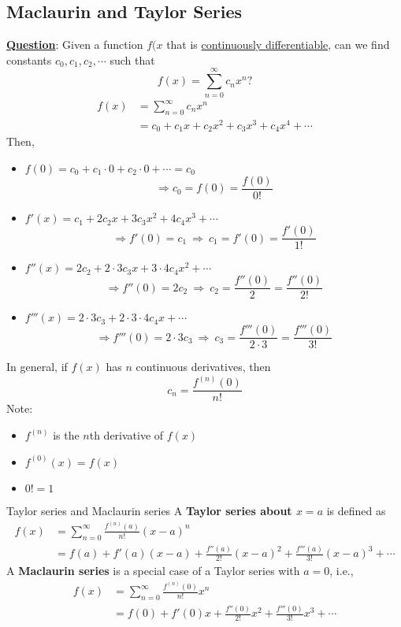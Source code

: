\documentclass[12pt,a4paper]{article}
\begin{document}
\subsection{Maclaurin and Taylor Series}
\textbf{\underline{Question}}: Given a function $f(x$ that is \underline{continuously differentiable}, can we find constants $c_0, c_1, c_2,\cdots$ such that $$f(x)=\sum^\infty_{n=0}c_nx^n?$$
$$\begin{aligned}
	f(x)&=\sum^\infty_{n=0}c_nx^n\\
	&=c_0+c_1x+c_2x^2+c_3x^3+c_4x^4+\cdots
\end{aligned}$$
Then, 
\begin{itemize}
	\item $f(0)=c_0+c_1\cdot0+c_2\cdot0+\cdots=c_0$ $$\Rightarrow c_0=f(0)=\frac{f(0)}{0!}$$
	\item $f'(x)=c_1+2c_2x+3c_3x^2+4c_4x^3+\cdots$ $$\Rightarrow f'(0)=c_1\ \Rightarrow\ c_1=f'(0)=\frac{f'(0)}{1!}$$
	\item $f''(x)=2c_2+2\cdot3c_3x+3\cdot4c_4x^2+\cdots$ $$\Rightarrow f''(0)=2c_2\ \Rightarrow\ c_2=\frac{f''(0)}{2}=\frac{f''(0)}{2!}$$
	\item $f'''(x)=2\cdot3c_3+2\cdot3\cdot4c_4x+\cdots$ $$\Rightarrow f'''(0)=2\cdot3c_3\ \Rightarrow\ c_3=\frac{f'''(0)}{2\cdot3}=\frac{f'''(0)}{3!}$$
\end{itemize}
In general, if $f(x)$ has $n$ continuous derivatives, then $$c_n=\frac{f^{(n)}(0)}{n!}$$
Note: 
\begin{itemize}
	\item $f^{(n)}$ is the $n$th derivative of $f(x)$
	\item $f^{(0)}(x)=f(x)$
	\item $0!=1$
\end{itemize}
\begin{df}{Taylor series and Maclaurin series}
	A \textbf{Taylor series about $x=a$} is defined as
	$$\begin{aligned}
		f(x)&=\sum^\infty_{n=0}\frac{f^{(n)}(a)}{n!}(x-a)^n\\
		&=f(a)+f'(a)(x-a)+\frac{f''(a)}{2!}(x-a)^2+\frac{f'''(a)}{3!}(x-a)^3+\cdots
	\end{aligned}$$	
	A \textbf{Maclaurin series} is a special case of a Taylor series with $a=0$, i.e., 
	$$\begin{aligned}
		f(x)&=\sum^\infty_{n=0}\frac{f^{(n)}(0)}{n!}x^n\\
		&=f(0)+f'(0)x+\frac{f''(0)}{2!}x^2+\frac{f'''(0)}{3!}x^3+\cdots
	\end{aligned}$$
\end{df}
\end{document}
